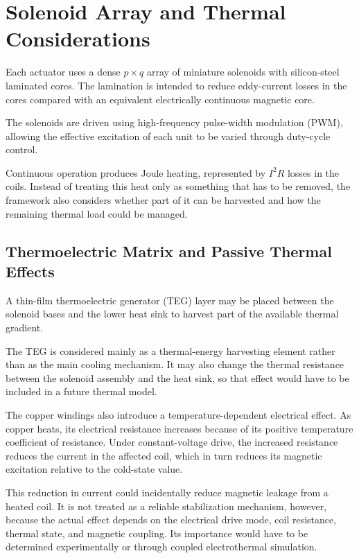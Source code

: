 \documentclass[12pt, a4paper]{article}
\begin{document}
\section{Solenoid Array and Thermal Considerations}

Each actuator uses a dense $p \times q$ array of miniature solenoids with silicon-steel laminated cores. The lamination is intended to reduce eddy-current losses in the cores compared with an equivalent electrically continuous magnetic core.

The solenoids are driven using high-frequency pulse-width modulation (PWM), allowing the effective excitation of each unit to be varied through duty-cycle control.

Continuous operation produces Joule heating, represented by $I^2R$ losses in the coils. Instead of treating this heat only as something that has to be removed, the framework also considers whether part of it can be harvested and how the remaining thermal load could be managed.

\subsection{Thermoelectric Matrix and Passive Thermal Effects}

A thin-film thermoelectric generator (TEG) layer may be placed between the solenoid bases and the lower heat sink to harvest part of the available thermal gradient.

The TEG is considered mainly as a thermal-energy harvesting element rather than as the main cooling mechanism. It may also change the thermal resistance between the solenoid assembly and the heat sink, so that effect would have to be included in a future thermal model.

The copper windings also introduce a temperature-dependent electrical effect. As copper heats, its electrical resistance increases because of its positive temperature coefficient of resistance. Under constant-voltage drive, the increased resistance reduces the current in the affected coil, which in turn reduces its magnetic excitation relative to the cold-state value.

This reduction in current could incidentally reduce magnetic leakage from a heated coil. It is not treated as a reliable stabilization mechanism, however, because the actual effect depends on the electrical drive mode, coil resistance, thermal state, and magnetic coupling. Its importance would have to be determined experimentally or through coupled electrothermal simulation.
\end{document}

